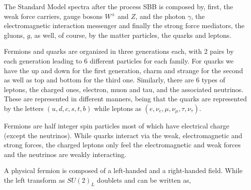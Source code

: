 The Standard Model spectra after the process SBB is composed by, first, the weak force carriers, gauge bosons $W^\pm$ and $Z$, and the photon $\gamma$, the electromagnetic interaction messenger and finally the strong force mediators, the gluons, $g$, as well, of course, by the matter particles, the quarks and leptons. 

Fermions and quarks are organized in three generations each, with 2 pairs by each generation leading to 6 different particles for each family. For quarks we have the up and down for the first generation, charm and strange for the second as well as top and bottom for the third one. Similarly, there are 6 types of leptons, the charged ones, electron, muon and tau, and the associated neutrinos. These are represented in different manners, being that the quarks are represented by the letters $(u,d,c,s,t,b)$ while leptons as $(e,\nu_{e},\mu,\nu_{\mu},\tau,\nu_{\tau})$. 

Fermions are half integer spin particles most of which have electrical charge (except the neutrinos).  While quarks interact via the weak, electromagnetic and strong forces, the charged leptons only feel the electromagnetic and weak forces and the neutrinos are weakly interacting.  

A physical fermion is composed of a left-handed and a right-handed field. While the left transform as $SU(2)_L$ doublets and can be written as,

